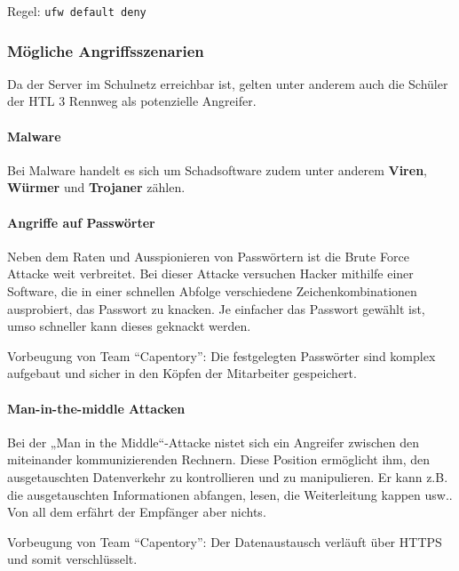 Regel: \texttt{ufw\ default\ deny}

\hypertarget{muxf6gliche-angriffsszenarien}{%
\subsubsection{Mögliche
Angriffsszenarien}\label{muxf6gliche-angriffsszenarien}}

Da der Server im Schulnetz erreichbar ist, gelten unter anderem auch die
Schüler der HTL 3 Rennweg als potenzielle Angreifer.

\hypertarget{malware}{%
\paragraph{Malware}\label{malware}}

Bei Malware handelt es sich um Schadsoftware zudem unter anderem
\textbf{Viren}, \textbf{Würmer} und \textbf{Trojaner} zählen.

\hypertarget{angriffe-auf-passwuxf6rter}{%
\paragraph{Angriffe auf Passwörter}\label{angriffe-auf-passwuxf6rter}}

Neben dem Raten und Ausspionieren von Passwörtern ist die Brute Force
Attacke weit verbreitet. Bei dieser Attacke versuchen Hacker mithilfe
einer Software, die in einer schnellen Abfolge verschiedene
Zeichenkombinationen ausprobiert, das Passwort zu knacken. Je einfacher
das Passwort gewählt ist, umso schneller kann dieses geknackt werden.

Vorbeugung von Team ``Capentory'': Die festgelegten Passwörter sind
komplex aufgebaut und sicher in den Köpfen der Mitarbeiter gespeichert.

\hypertarget{man-in-the-middle-attacken}{%
\paragraph{Man-in-the-middle
Attacken}\label{man-in-the-middle-attacken}}

Bei der „Man in the Middle``-Attacke nistet sich ein Angreifer zwischen
den miteinander kommunizierenden Rechnern. Diese Position ermöglicht
ihm, den ausgetauschten Datenverkehr zu kontrollieren und zu
manipulieren. Er kann z.B. die ausgetauschten Informationen abfangen,
lesen, die Weiterleitung kappen usw.. Von all dem erfährt der Empfänger
aber nichts.

Vorbeugung von Team ``Capentory'': Der Datenaustausch verläuft über
HTTPS und somit verschlüsselt.


